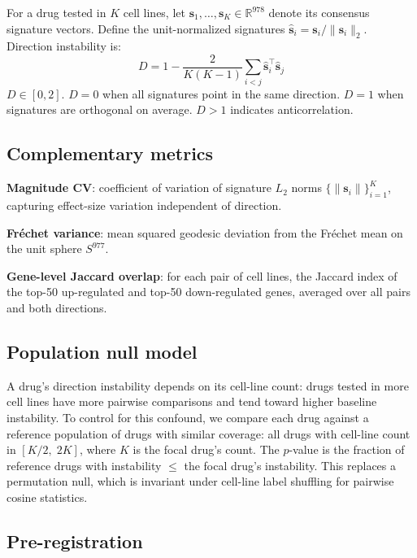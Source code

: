 \documentclass[11pt]{article}
\begin{document}
For a drug tested in $K$ cell lines, let $\mathbf{s}_1, \ldots,
\mathbf{s}_K \in \mathbb{R}^{978}$ denote its consensus signature vectors.
Define the unit-normalized signatures $\hat{\mathbf{s}}_i =
\mathbf{s}_i / \|\mathbf{s}_i\|_2$. Direction instability is:
\begin{equation}
  D = 1 - \frac{2}{K(K-1)} \sum_{i < j}
    \hat{\mathbf{s}}_i^\top \hat{\mathbf{s}}_j
  \label{eq:direction_instability}
\end{equation}
$D \in [0, 2]$. $D = 0$ when all signatures point in the same direction.
$D = 1$ when signatures are orthogonal on average. $D > 1$ indicates
anticorrelation.

\subsection{Complementary metrics}

\textbf{Magnitude CV}: coefficient of variation of signature $L_2$ norms
$\{\|\mathbf{s}_i\|\}_{i=1}^K$, capturing effect-size variation independent
of direction.

\textbf{Fr\'echet variance}: mean squared geodesic deviation from the
Fr\'echet mean on the unit sphere $S^{977}$.

\textbf{Gene-level Jaccard overlap}: for each pair of cell lines, the
Jaccard index of the top-50 up-regulated and top-50 down-regulated genes,
averaged over all pairs and both directions.

\subsection{Population null model}

A drug's direction instability depends on its cell-line count: drugs tested
in more cell lines have more pairwise comparisons and tend toward higher
baseline instability. To control for this confound, we compare each drug
against a reference population of drugs with similar coverage: all drugs
with cell-line count in $[K/2,\; 2K]$, where $K$ is the focal drug's count.
The $p$-value is the fraction of reference drugs with instability $\leq$
the focal drug's instability. This replaces a permutation null, which
is invariant under cell-line label shuffling for pairwise cosine statistics.

\subsection{Pre-registration}
\end{document}
